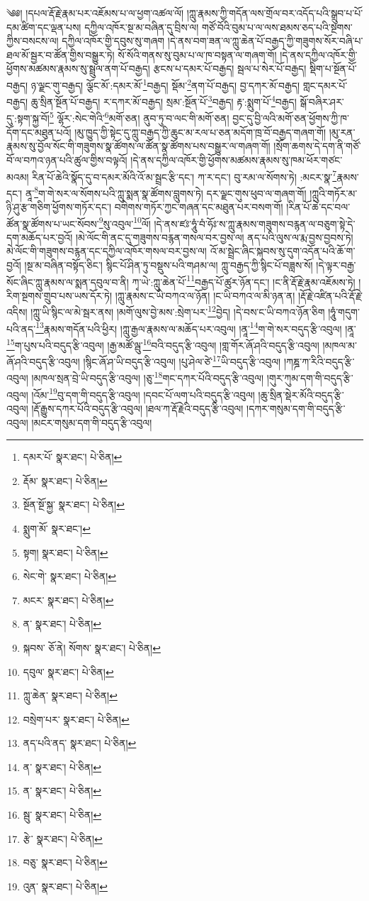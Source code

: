 \setcounter{footnote}{0} 
༄༅། །དཔལ་རྡོ་རྗེ་རྣམ་པར་འཇོམས་པ་ལ་ཕྱག་འཚལ་ལོ། །ཀླུ་རྣམས་ཀྱི་གདོན་ལས་གྲོལ་བར་འདོད་པའི་སྒྲུབ་པ་པོ་དམ་ཚིག་དང་ལྡན་པས། དཀྱིལ་འཁོར་སྔ་མ་བཞིན་དུ་བྲིས་ལ། གཙོ་བོའི་བུམ་པ་ལ་ལས་ཐམས་ཅད་པའི་སྔགས་ཀྱིས་བསངས་ལ། དཀྱིལ་འཁོར་གྱི་དབུས་སུ་གཞག །དེ་ནས་བག་ཟན་ལ་ཀླུ་ཆེན་པོ་བརྒྱད་ཀྱི་གཟུགས་སོར་བཞི་པ་ཐལ་མོ་སྦྱར་བ་ཚོན་གྱིས་བསྒྱུར་ཏེ། སོ་སོའི་གནས་སུ་བུམ་པ་ལ་ཁ་བསྟན་ལ་གཞག་གོ། །དེ་ནས་དཀྱིལ་འཁོར་གྱི་ཕྱོགས་མཚམས་རྣམས་སུ་སྦྲུལ་ནག་པོ་བརྒྱད། རྩངས་པ་དམར་པོ་བརྒྱད། སྦལ་པ་སེར་པོ་བརྒྱད། སྡིག་པ་སྔོན་པོ་བརྒྱད། ཉ་ལྗང་གུ་བརྒྱད། ལྕོང་མོ་:དམར་མོ་\footnote{དམར་པོ་  སྣར་ཐང་།  པེ་ཅིན། }བརྒྱད། སྡོམ་\footnote{རྡོམ་  སྣར་ཐང་།  པེ་ཅིན། }ནག་པོ་བརྒྱད། བྱ་དཀར་མོ་བརྒྱད། གླང་དམར་པོ་བརྒྱད། ཆུ་སྲིན་སྔོན་པོ་བརྒྱད། ར་དཀར་མོ་བརྒྱད། སྲམ་:སྔོན་པོ་\footnote{སྔོན་སྔོ་སྐྱ་  སྣར་ཐང་།  པེ་ཅིན། }བརྒྱད། རྟ་:སྨུག་པོ་\footnote{སྨུག་མོ་  སྣར་ཐང་། }བརྒྱད། སྒོ་བཞིར་ཤར་དུ་:སྟག་སྐྱ་བོ།\footnote{སྟག།  སྣར་ཐང་།  པེ་ཅིན། } ལྷོར་:སེང་གེའི་\footnote{སེང་གེ་  སྣར་ཐང་།  པེ་ཅིན། }མགོ་ཅན། ནུབ་ཏུ་བ་ལང་གི་མགོ་ཅན། བྱང་དུ་བྱི་ལའི་མགོ་ཅན་ཕྱོགས་ཀྱི་ཁ་དོག་དང་མཐུན་པའོ། །མུ་ཁྱུད་ཀྱི་སྟེང་དུ་ཀླུ་བརྒྱད་ཀྱི་ཆུང་མ་རལ་པ་ཅན་མདོག་ཁྲ་བོ་བརྒྱད་གཞག་གོ། །མུ་རན་རྣམས་སུ་བྱོལ་སོང་གི་གཟུགས་སྣ་ཚོགས་ལ་ཚོན་སྣ་ཚོགས་པས་བསྒྱུར་ལ་གཞག་གོ། །སྲོག་ཆགས་དེ་དག་ནི་གཙོ་བོ་ལ་བཀའ་ཉན་པའི་ཚུལ་གྱིས་བལྟའོ། །དེ་ནས་དཀྱིལ་འཁོར་གྱི་ཕྱོགས་མཚམས་རྣམས་སུ་ཁམ་ཕོར་གཙང་མའམ། རིན་པོ་ཆེའི་སྣོད་དུ་བ་དམར་མོའི་འོ་མ་སྦྲང་རྩི་དང་། ཀ་ར་དང་། བུ་རམ་ལ་སོགས་ཏེ། :མངར་སྣ་\footnote{མངར་  སྣར་ཐང་།  པེ་ཅིན། }རྣམས་དང་། ནཱ་\footnote{ན་  སྣར་ཐང་།  པེ་ཅིན། }ག་གེ་སར་ལ་སོགས་པའི་ཀླུ་སྨན་སྣ་ཚོགས་བླུགས་ཏེ། དར་ལྗང་གུས་ཕུབ་ལ་གཞག་གོ། །ཀླུའི་གཏོར་མ་ཉི་ཤུ་རྩ་གཅིག་ཕྱོགས་གཏོར་དང་། བགེགས་གཏོར་ཀྱང་གཞན་དང་མཐུན་པར་བསག་གོ། །རིན་པོ་ཆེ་དང་བལ་ཚོན་སྣ་ཚོགས་པ་ཡང་སོབས་\footnote{སྐབས་  ཅོ་ནེ། སོགས་  སྣར་ཐང་།  པེ་ཅིན། }སུ་འབུལ་\footnote{དབུལ་  སྣར་ཐང་།  པེ་ཅིན། }ལོ། །དེ་ནས་ཛཿ་ཧཱུཾ་བཾ་ཧོཿ་ས་ཀླུ་རྣམས་གཟུགས་བརྙན་ལ་བཅུག་སྟེ་དེ་དག་མཆོད་པར་བྱའོ། །མེ་ལོང་གི་ནང་དུ་གཟུགས་བརྙན་གསལ་བར་བྱས་ལ། ནད་པའི་ལུས་ལ་རྨ་བྱས་བྱབས་ཏེ། མེ་ལོང་གི་གཟུགས་བརྙན་དང་དཀྱིལ་འཁོར་གསལ་བར་བྱས་ལ། འོ་མ་སྦྲེང་ཞིང་སྐབས་སུ་དུག་འདོན་པའི་ཆོ་ག་བྱའོ། །སྔ་མ་བཞིན་བསྟོད་ཅིང་། སྙིང་པོ་ཤིན་ཏུ་བསྡུས་པའི་གཤམ་ལ། ཀླུ་བརྒྱད་ཀྱི་སྙིང་པོ་བཟླས་སོ། །དེ་ལྟར་བརྒྱ་སོང་ཞིང་ཀླུ་རྣམས་ལ་སྨན་དབུལ་བ་ནི། ཀྭ་ཡེ་:ཀླུ་ཆེན་པོ་\footnote{ཀླུ་ཆེན་  སྣར་ཐང་།  པེ་ཅིན། }བརྒྱད་པོ་ཚུར་ཉོན་དང་། །ང་ནི་རྡོ་རྗེ་རྣམ་འཇོམས་ཏེ། །རིག་སྔགས་གྲུབ་པས་ཡས་དོར་ཏེ། །ཀླུ་རྣམས་ང་ཡི་བཀའ་ལ་ཉོན། །ང་ཡི་བཀའ་ལ་མི་ཉན་ན། །རྡོ་རྗེ་འཛིན་པའི་རྡོ་རྗེ་འདིས། །ཀླུ་ཡི་སྙིང་ལ་མེ་སྦར་ནས། །མགོ་ལུས་བྱེ་མས་:སྲེག་པར་\footnote{བསྲེག་པར་  སྣར་ཐང་།  པེ་ཅིན། }བྱེད། །དེ་བས་ང་ཡི་བཀའ་ཉོན་ཅིག །ཧཱུཾ་གདུག་པའི་ནད་\footnote{ནད་པའི་ནད་  སྣར་ཐང་།  པེ་ཅིན། }རྣམས་གདོན་པའི་ཕྱིར། །ཀླུ་རྒྱལ་རྣམས་ལ་མཆོད་པར་འབུལ། །ནཱ་\footnote{ན་  སྣར་ཐང་།  པེ་ཅིན། }ག་གེ་སར་བདུད་རྩི་འབུལ། །ནཱ་\footnote{ན་  སྣར་ཐང་།  པེ་ཅིན། }ག་པུས་པའི་བདུད་རྩི་འབུལ། །རྒྱ་མཚོ་ལྦུ་\footnote{སྦུ་  སྣར་ཐང་།  པེ་ཅིན། }བའི་བདུད་རྩི་འབུལ། །གླ་གོར་ཞོ་ཤའི་བདུད་རྩི་འབུལ། །མཁལ་མ་ཞོ་ཤའི་བདུད་རྩི་འབུལ། །སྙིང་ཞོ་ཤ་ཡི་བདུད་རྩི་འབུལ། །པུ་ཤེལ་ཙེ་\footnote{རྩེ་  སྣར་ཐང་།  པེ་ཅིན། }ཡི་བདུད་རྩི་འབུལ། །ཀཎྜ་ཀ་རིའི་བདུད་རྩི་འབུལ། །མཁལ་སྲན་བྲེ་ཡི་བདུད་རྩི་འབུལ། །ཅུ་\footnote{བཅུ་  སྣར་ཐང་།  པེ་ཅིན། }གང་དཀར་པོའི་བདུད་རྩི་འབུལ། །གུར་ཀུམ་དག་གི་བདུད་རྩི་འབུལ། །འོམ་\footnote{འུན་  སྣར་ཐང་།  པེ་ཅིན། }བུ་དག་གི་བདུད་རྩི་འབུལ། །དབང་པོ་ལག་པའི་བདུད་རྩི་འབུལ། །ཆུ་སྲིན་སྡེར་མོའི་བདུད་རྩི་འབུལ། །རྡོ་རྒྱུས་དཀར་པོའི་བདུད་རྩི་འབུལ། །ཐལ་ཀ་རྡོ་རྗེའི་བདུད་རྩི་འབུལ། །དཀར་གསུམ་དག་གི་བདུད་རྩི་འབུལ། །མངར་གསུམ་དག་གི་བདུད་རྩི་འབུལ། 